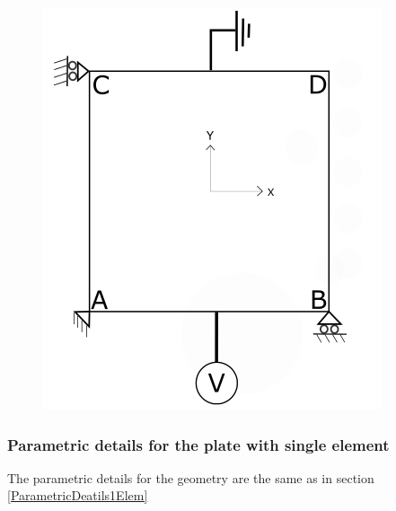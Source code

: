 \documentclass[11pt]{article}
\begin{document}
\begin{figure}[H]
\begin{minipage}{.3\textwidth}
		\includegraphics[width=1.2\linewidth]{PureElectrical.png}
		\label{PureElectrical22}
	\end{minipage}
\end{figure}
\subsubsection{Parametric details for the plate with single element}


The parametric details for the geometry are the same as in section \hyperref[ParametricDeatils1Elem]{\ref{ParametricDeatils1Elem}}
\end{document}
